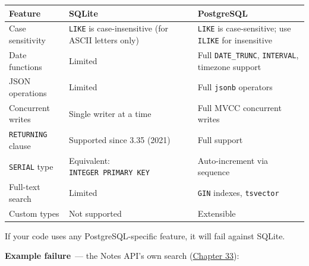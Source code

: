 {\def\LTcaptype{none} %
\begin{longtable}[]{@{}
  >{\raggedright\arraybackslash}p{}
  >{\raggedright\arraybackslash}p{}
  >{\raggedright\arraybackslash}p{}@{}}
\toprule\noalign{}
\begin{minipage}[b]{\linewidth}\raggedright
Feature
\end{minipage} & \begin{minipage}[b]{\linewidth}\raggedright
SQLite
\end{minipage} & \begin{minipage}[b]{\linewidth}\raggedright
PostgreSQL
\end{minipage} \\
\midrule\noalign{}
\endhead
\bottomrule\noalign{}
\endlastfoot
Case sensitivity & \texttt{LIKE} is case-insensitive (for ASCII letters only) & \texttt{LIKE} is case-sensitive; use \texttt{ILIKE} for insensitive \\
Date functions & Limited & Full \texttt{DATE\_TRUNC}, \texttt{INTERVAL}, timezone support \\
JSON operations & Limited & Full \texttt{jsonb} operators \\
Concurrent writes & Single writer at a time & Full MVCC concurrent writes \\
\texttt{RETURNING} clause & Supported since 3.35 (2021) & Full support \\
\texttt{SERIAL} type & Equivalent: \texttt{INTEGER\ PRIMARY\ KEY} & Auto-increment via sequence \\
Full-text search & Limited & \texttt{GIN} indexes, \texttt{tsvector} \\
Custom types & Not supported & Extensible \\
\end{longtable}
}

If your code uses any PostgreSQL-specific feature, it will fail against SQLite.

\textbf{Example failure}~--- the Notes API's own search (\hyperref[ch:33-logic-execution]{Chapter 33}):

\begin{codebox}[short]

\begin{Shaded}
\begin{Highlighting}[]
\NormalTok{, (}\SpecialCharTok{\{}\SpecialCharTok{\}}\NormalTok{,))}

\end{Highlighting}
\end{Shaded}

\end{codebox}

